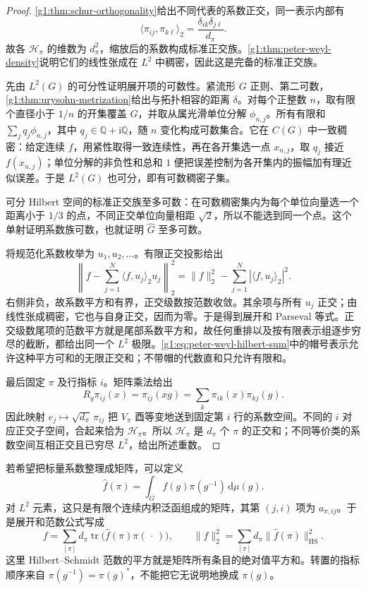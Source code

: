 \begin{proof}
	\cref{g1:thm:schur-orthogonality}给出不同代表的系数正交，同一表示内部有
	\[
		\langle\pi_{ij},\pi_{k\ell}\rangle_2
		=\frac{\delta_{ik}\delta_{j\ell}}{d_\pi}.
	\]
	故各 \(\mathcal H_\pi\) 的维数为 \(d_\pi^2\)，缩放后的系数构成标准正交族。\cref{g1:thm:peter-weyl-density}说明它们的线性张成在 \(L^2\) 中稠密，因此这是完备的标准正交族。

	先由 \(L^2(G)\) 的可分性证明展开项的可数性。紧流形 \(G\) 正则、第二可数，\cref{g1:thm:urysohn-metrization}给出与拓扑相容的距离 \(\delta\)。对每个正整数 \(n\)，取有限个直径小于 \(1/n\) 的开集覆盖 \(G\)，并取从属光滑单位分解 \(\phi_{n,j}\)。所有有限和 \(\sum_jq_j\phi_{n,j}\)，其中 \(q_j\in\mathbb Q+\mathrm{i}\mathbb Q\)，随 \(n\) 变化构成可数集合。它在 \(C(G)\) 中一致稠密：给定连续 \(f\)，用紧性取得一致连续性，再在各开集选一点 \(x_{n,j}\)，取 \(q_j\) 接近 \(f(x_{n,j})\)；单位分解的非负性和总和 \(1\) 便把误差控制为各开集内的振幅加有理近似误差。于是 \(L^2(G)\) 也可分，即有可数稠密子集。

	可分 Hilbert 空间的标准正交族至多可数：在可数稠密集内为每个单位向量选一个距离小于 \(1/3\) 的点，不同正交单位向量相距 \(\sqrt2\)，所以不能选到同一个点。这个单射证明系数族可数，也就证明 \(\widehat G\) 至多可数。

	将规范化系数枚举为 \(u_1,u_2,\ldots\)。有限正交投影给出
	\[
		\left\|f-\sum_{j=1}^N\langle f,u_j\rangle_2u_j\right\|_2^2
		=\|f\|_2^2-\sum_{j=1}^N|\langle f,u_j\rangle_2|^2.
	\]
	右侧非负，故系数平方和有界，正交级数按范数收敛。其余项与所有 \(u_j\) 正交；由线性张成稠密，它也与自身正交，因而为零。于是得到展开和 Parseval 等式。正交级数尾项的范数平方就是尾部系数平方和，故任何重排以及按有限表示组逐步穷尽的截断，都给出同一个 \(L^2\) 极限。\eqref{g1:eq:peter-weyl-hilbert-sum}中的帽号表示允许这种平方可和的无限正交和；不带帽的代数直和只允许有限和。

	最后固定 \(\pi\) 及行指标 \(i\)。矩阵乘法给出
	\[
		R_g\pi_{ij}(x)=\pi_{ij}(xg)
		=\sum_k\pi_{ik}(x)\pi_{kj}(g).
	\]
	因此映射 \(e_j\mapsto\sqrt{d_\pi}\,\pi_{ij}\) 把 \(V_\pi\) 酉等变地送到固定第 \(i\) 行的系数空间。不同的 \(i\) 对应正交子空间，合起来恰为 \(\mathcal H_\pi\)。所以 \(\mathcal H_\pi\) 是 \(d_\pi\) 个 \(\pi\) 的正交和；不同等价类的系数空间互相正交且已穷尽 \(L^2\)，给出所述重数。
\end{proof}

若希望把标量系数整理成矩阵，可以定义
\[
	\widehat f(\pi)=\int_G f(g)\pi(g^{-1})\,\mathrm{d}\mu(g).
\]
对 \(L^2\) 元素，这只是有限个连续内积泛函组成的矩阵，其第 \((j,i)\) 项为 \(a_{\pi,ij}\)。于是展开和范数公式写成
\[
	f=\sum_{[\pi]}d_\pi\operatorname{tr}\bigl(\widehat f(\pi)\pi(\,\cdot\,)\bigr),
	\qquad \|f\|_2^2=\sum_{[\pi]}d_\pi\|\widehat f(\pi)\|_{\mathrm{HS}}^2.
\]
这里 Hilbert--Schmidt 范数的平方就是矩阵所有条目的绝对值平方和。转置的指标顺序来自 \(\pi(g^{-1})=\pi(g)^*\)，不能把它无说明地换成 \(\pi(g)\)。

